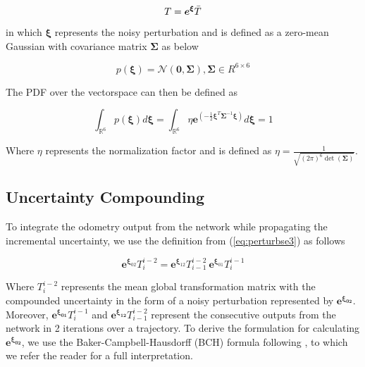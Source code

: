 \documentclass[letterpaper, 10 pt]{ieeeconf}  %
\begin{document}
\begin{equation}
    T = \boldsymbol{e}^{\boldsymbol{\xi}} \Bar{T}
    \label{eq:perturbse3}
\end{equation}

in which $\boldsymbol{\xi}$ represents the noisy perturbation and is defined as a zero-mean Gaussian with covariance matrix $\mathbf{\Sigma}$ as below

\begin{equation}
    p(\boldsymbol{\xi})=\mathcal{N}(\mathbf{0}, \mathbf{\Sigma}), \mathbf{\Sigma}\in R^{6\times 6}
    \label{eq:perturbgaussian}
\end{equation}

The PDF over the vectorspace can then be defined as \cite{barfoot2014associating}

\begin{equation}
\int_{\mathbb{R}^{6}} p(\boldsymbol{\xi}) d \boldsymbol{\xi}=\int_{\mathbb{R}^{6}} \eta \boldsymbol{e}^{(-\frac{1}{2} \boldsymbol{\xi}^{T} \boldsymbol{\Sigma}^{-1} \boldsymbol{\xi})} d \boldsymbol{\xi}=1
\label{eq:perturbpdf}
\end{equation}

Where $\eta$ represents the normalization factor and is defined as $\eta=\frac{1}{\sqrt{(2 \pi)^{6} \operatorname{det}(\mathbf{\Sigma})}}$.

\subsection{Uncertainty Compounding}
To integrate the odometry output from the network while propagating the incremental uncertainty, we use the definition from (\ref{eq:perturbse3}) as follows

\begin{equation}
    \boldsymbol{e}^{\boldsymbol{\xi}_{02}}T^{i-2}_{i} = \boldsymbol{e}^{\boldsymbol{\xi}_{12}} T^{i-2}_{i-1}~\boldsymbol{e}^{\boldsymbol{\xi}_{01}} T^{i-1}_{i}
    \label{eq:compoundingtoy}
\end{equation}

Where $T^{i-2}_{i}$ represents the mean global transformation matrix with the compounded uncertainty in the form of a noisy perturbation represented by $\boldsymbol{e}^{\boldsymbol{\xi_{02}}}$. Moreover, $\boldsymbol{e}^{\boldsymbol{\xi_{01}}} T^{i-1}_{i}$ and $\boldsymbol{e}^{\boldsymbol{\xi_{12}}} T^{i-2}_{i-1}$ represent the consecutive outputs from the network in 2 iterations over a trajectory.
To derive the formulation for calculating $\boldsymbol{e}^{\boldsymbol{\xi_{02}}}$, we use the Baker-Campbell-Hausdorff (BCH) formula following \cite{barfoot2017state}, to which we refer the reader for a full interpretation. 
\end{document}
